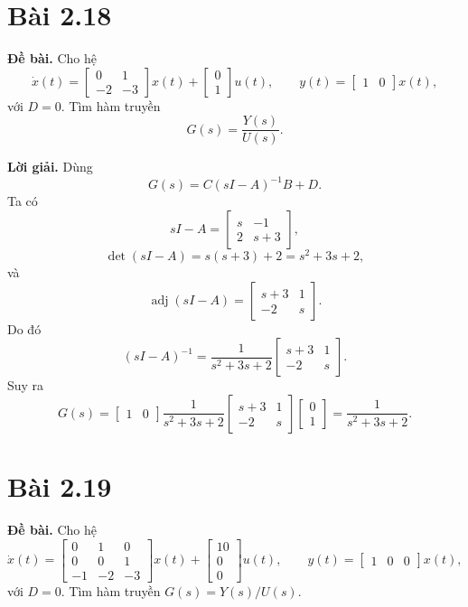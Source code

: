 \documentclass[11pt,a4paper]{article}
\newcommand{\baitap}[1]{%
  \Needspace{4\baselineskip}%
  \section*{Bài #1}%
}
\newcommand{\debai}{\par\noindent\textbf{Đề bài.}\enspace}
\newcommand{\loigiai}{\par\smallskip\noindent\textbf{Lời giải.}\enspace}
\begin{document}
\baitap{2.18}
\debai
Cho hệ
\[
\dot x(t)=
\begin{bmatrix}
0&1\\
-2&-3
\end{bmatrix}x(t)
+
\begin{bmatrix}
0\\1
\end{bmatrix}u(t),
\qquad
y(t)=\begin{bmatrix}1&0\end{bmatrix}x(t),
\]
với \(D=0\). Tìm hàm truyền
\[
G(s)=\frac{Y(s)}{U(s)}.
\]

\loigiai
Dùng
\[
G(s)=C(sI-A)^{-1}B+D.
\]
Ta có
\[
sI-A=
\begin{bmatrix}
s&-1\\
2&s+3
\end{bmatrix},
\]
\[
\det(sI-A)=s(s+3)+2=s^2+3s+2,
\]
và
\[
\operatorname{adj}(sI-A)=
\begin{bmatrix}
s+3&1\\
-2&s
\end{bmatrix}.
\]
Do đó
\[
(sI-A)^{-1}
=
\frac{1}{s^2+3s+2}
\begin{bmatrix}
s+3&1\\
-2&s
\end{bmatrix}.
\]
Suy ra
\[
G(s)
=
\begin{bmatrix}1&0\end{bmatrix}
\frac{1}{s^2+3s+2}
\begin{bmatrix}
s+3&1\\
-2&s
\end{bmatrix}
\begin{bmatrix}0\\1\end{bmatrix}
=
\boxed{\frac{1}{s^2+3s+2}}.
\]

\baitap{2.19}
\debai
Cho hệ
\[
\dot x(t)=
\begin{bmatrix}
0&1&0\\
0&0&1\\
-1&-2&-3
\end{bmatrix}x(t)
+
\begin{bmatrix}
10\\0\\0
\end{bmatrix}u(t),
\qquad
y(t)=
\begin{bmatrix}
1&0&0
\end{bmatrix}x(t),
\]
với \(D=0\). Tìm hàm truyền \(G(s)=Y(s)/U(s)\).
\end{document}
